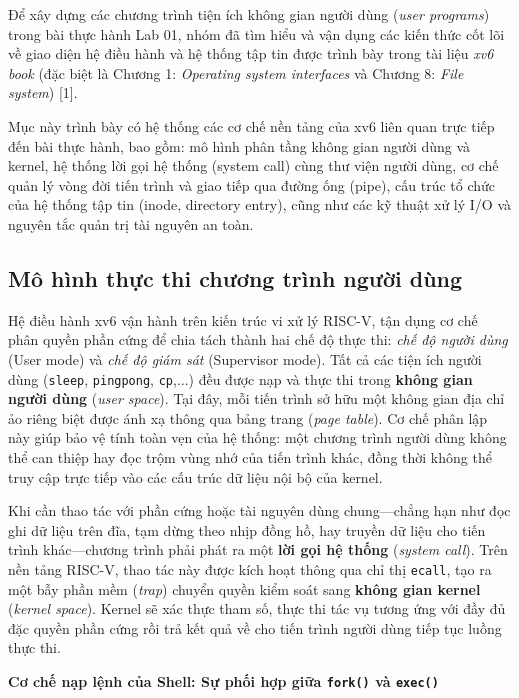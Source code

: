 \documentclass[12pt,a4paper]{article}
\begin{document}
Để xây dựng các chương trình tiện ích không gian người dùng (\textit{user programs}) trong bài thực hành Lab 01, nhóm đã tìm hiểu và vận dụng các kiến thức cốt lõi về giao diện hệ điều hành và hệ thống tập tin được trình bày trong tài liệu \textit{xv6 book} (đặc biệt là Chương 1: \textit{Operating system interfaces} và Chương 8: \textit{File system}) [1].

Mục này trình bày có hệ thống các cơ chế nền tảng của xv6 liên quan trực tiếp đến bài thực hành, bao gồm: mô hình phân tầng không gian người dùng và kernel, hệ thống lời gọi hệ thống (system call) cùng thư viện người dùng, cơ chế quản lý vòng đời tiến trình và giao tiếp qua đường ống (pipe), cấu trúc tổ chức của hệ thống tập tin (inode, directory entry), cũng như các kỹ thuật xử lý I/O và nguyên tắc quản trị tài nguyên an toàn.

\subsection{Mô hình thực thi chương trình người dùng}

Hệ điều hành xv6 vận hành trên kiến trúc vi xử lý RISC-V, tận dụng cơ chế phân quyền phần cứng để chia tách thành hai chế độ thực thi: \textit{chế độ người dùng} (User mode) và \textit{chế độ giám sát} (Supervisor mode). Tất cả các tiện ích người dùng (\texttt{sleep}, \texttt{pingpong}, \texttt{cp},...) đều được nạp và thực thi trong \textbf{không gian người dùng} (\textit{user space}). Tại đây, mỗi tiến trình sở hữu một không gian địa chỉ ảo riêng biệt được ánh xạ thông qua bảng trang (\textit{page table}). Cơ chế phân lập này giúp bảo vệ tính toàn vẹn của hệ thống: một chương trình người dùng không thể can thiệp hay đọc trộm vùng nhớ của tiến trình khác, đồng thời không thể truy cập trực tiếp vào các cấu trúc dữ liệu nội bộ của kernel.

Khi cần thao tác với phần cứng hoặc tài nguyên dùng chung---chẳng hạn như đọc ghi dữ liệu trên đĩa, tạm dừng theo nhịp đồng hồ, hay truyền dữ liệu cho tiến trình khác---chương trình phải phát ra một \textbf{lời gọi hệ thống} (\textit{system call}). Trên nền tảng RISC-V, thao tác này được kích hoạt thông qua chỉ thị \texttt{ecall}, tạo ra một bẫy phần mềm (\textit{trap}) chuyển quyền kiểm soát sang \textbf{không gian kernel} (\textit{kernel space}). Kernel sẽ xác thực tham số, thực thi tác vụ tương ứng với đầy đủ đặc quyền phần cứng rồi trả kết quả về cho tiến trình người dùng tiếp tục luồng thực thi.

\textbf{Cơ chế nạp lệnh của Shell: Sự phối hợp giữa \texttt{fork()} và \texttt{exec()}}
\end{document}
